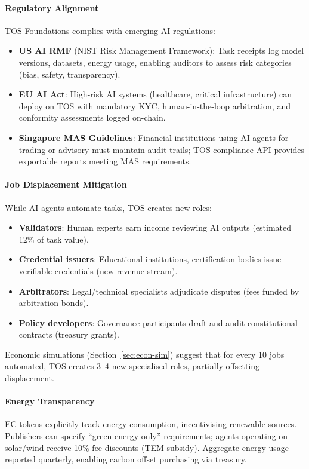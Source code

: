 \documentclass[11pt]{article}
\begin{document}
\paragraph{Regulatory Alignment} TOS Foundations complies with emerging AI regulations:
\begin{itemize}[noitemsep]
  \item \textbf{US AI RMF} (NIST Risk Management Framework): Task receipts log model versions, datasets, energy usage, enabling auditors to assess risk categories (bias, safety, transparency).
  \item \textbf{EU AI Act}: High-risk AI systems (healthcare, critical infrastructure) can deploy on TOS with mandatory KYC, human-in-the-loop arbitration, and conformity assessments logged on-chain.
  \item \textbf{Singapore MAS Guidelines}: Financial institutions using AI agents for trading or advisory must maintain audit trails; TOS compliance API provides exportable reports meeting MAS requirements.
\end{itemize}

\paragraph{Job Displacement Mitigation} While AI agents automate tasks, TOS creates new roles:
\begin{itemize}[noitemsep]
  \item \textbf{Validators}: Human experts earn income reviewing AI outputs (estimated 12\% of task value).
  \item \textbf{Credential issuers}: Educational institutions, certification bodies issue verifiable credentials (new revenue stream).
  \item \textbf{Arbitrators}: Legal/technical specialists adjudicate disputes (fees funded by arbitration bonds).
  \item \textbf{Policy developers}: Governance participants draft and audit constitutional contracts (treasury grants).
\end{itemize}
Economic simulations (Section~\ref{sec:econ-sim}) suggest that for every 10 jobs automated, TOS creates 3--4 new specialised roles, partially offsetting displacement.

\paragraph{Energy Transparency} EC tokens explicitly track energy consumption, incentivising renewable sources. Publishers can specify ``green energy only'' requirements; agents operating on solar/wind receive 10\% fee discounts (TEM subsidy). Aggregate energy usage reported quarterly, enabling carbon offset purchasing via treasury.
\end{document}
